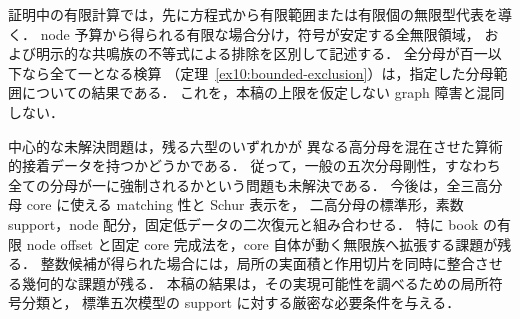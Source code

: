 証明中の有限計算では，先に方程式から有限範囲または有限個の無限型代表を導く．
node 予算から得られる有限な場合分け，符号が安定する全無限領域，
および明示的な共鳴族の不等式による排除を区別して記述する．
全分母が百一以下なら全て一となる検算
（定理~\ref{ex10:bounded-exclusion}）は，指定した分母範囲についての結果である．
これを，本稿の上限を仮定しない graph 障害と混同しない．

中心的な未解決問題は，残る六型のいずれかが
異なる高分母を混在させた算術的接着データを持つかどうかである．
従って，一般の五次分母剛性，すなわち全ての分母が一に強制されるかという問題も未解決である．
今後は，全三高分母 core に使える matching 性と Schur 表示を，
二高分母の標準形，素数 support，node 配分，固定低データの二次復元と組み合わせる．
特に book の有限 node offset と固定 core 完成法を，core 自体が動く無限族へ拡張する課題が残る．
整数候補が得られた場合には，局所の実面積と作用切片を同時に整合させる幾何的な課題が残る．
本稿の結果は，その実現可能性を調べるための局所符号分類と，
標準五次模型の support に対する厳密な必要条件を与える．
